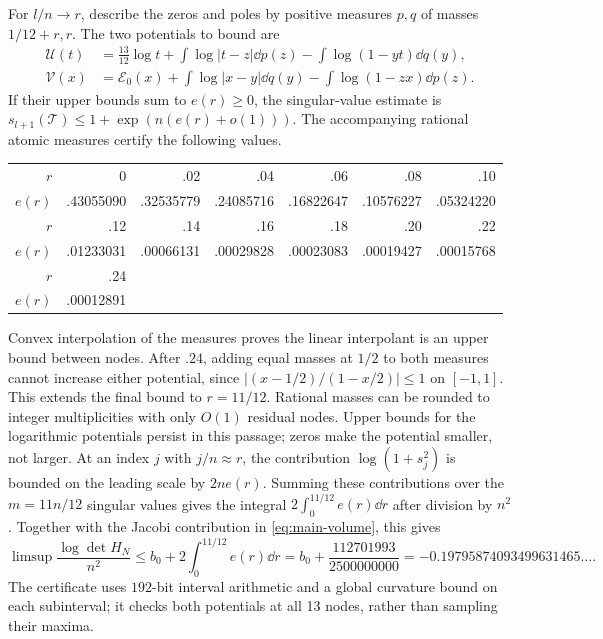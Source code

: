 For $l/n\to r$, describe the zeros and poles by positive measures
$p,q$ of masses $1/12+r,r$. The two potentials to bound are
\begin{align*}
 \mathcal U(t)&=\tfrac{13}{12}\log t
       +\int\log|t-z|\dd p(z)-\int\log(1-yt)\dd q(y),\\
 \mathcal V(x)&=\mathcal E_0(x)
       +\int\log|x-y|\dd q(y)-\int\log(1-zx)\dd p(z).
\end{align*}
If their upper bounds sum to $e(r)\ge0$, the singular-value estimate
is $s_{l+1}(\mathcal T)\le1+\exp(n(e(r)+o(1)))$.
The accompanying rational atomic measures certify the following values.
\begin{center}\small
\begin{tabular}{rrrrrrr}
\toprule
$r$&0&.02&.04&.06&.08&.10\\
$e(r)$&.43055090&.32535779&.24085716&.16822647&.10576227&.05324220\\
\midrule
$r$&.12&.14&.16&.18&.20&.22\\
$e(r)$&.01233031&.00066131&.00029828&.00023083&.00019427&.00015768\\
\midrule
$r$&.24&&&&&\\
$e(r)$&.00012891&&&&&\\
\bottomrule
\end{tabular}
\end{center}
Convex interpolation of the measures proves the linear interpolant is
an upper bound between nodes. After $.24$, adding equal masses at
$1/2$ to both measures cannot increase either potential, since
$|(x-1/2)/(1-x/2)|\le1$ on $[-1,1]$. This extends the final bound
to $r=11/12$. Rational masses can be rounded to integer multiplicities
with only $O(1)$ residual nodes. Upper bounds for the logarithmic
potentials persist in this passage; zeros make the potential smaller,
not larger. At an index $j$ with $j/n\approx r$, the contribution
$\log(1+s_j^2)$ is bounded on the leading scale by $2ne(r)$.
Summing these contributions over the $m=11n/12$ singular values gives
the integral $2\int_0^{11/12}e(r)\dd r$ after division by $n^2$.
Together with the Jacobi contribution in \eqref{eq:main-volume}, this gives
\begin{equation}\label{eq:main-row-bound}
 \limsup\frac{\log\det H_N}{n^2}
 \le b_0+2\int_0^{11/12}e(r)\dd r
 =b_0+\frac{112701993}{2500000000}
 =-0.19795874093499631465\ldots.
\end{equation}
The certificate uses $192$-bit interval arithmetic and a global
curvature bound on each subinterval; it checks both potentials at all
13 nodes, rather than sampling their maxima.

